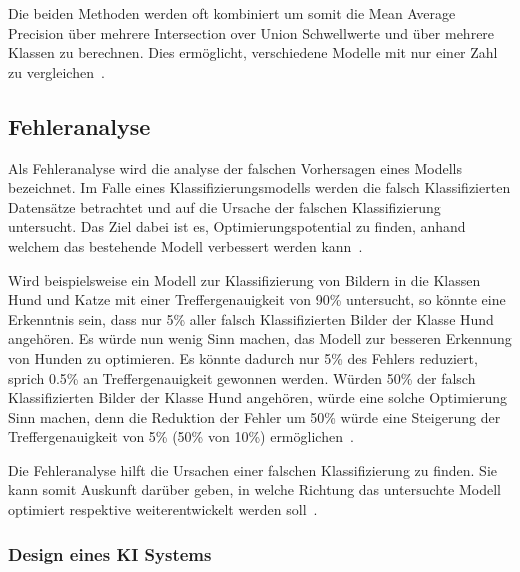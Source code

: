 Die beiden Methoden werden oft kombiniert um somit die Mean Average Precision über mehrere Intersection over Union Schwellwerte und über mehrere Klassen zu berechnen. Dies ermöglicht, verschiedene Modelle mit nur einer Zahl zu vergleichen~\autocite{AP}.

\subsection{Fehleranalyse}
\label{chap:error-analysis}

Als Fehleranalyse wird die analyse der falschen Vorhersagen eines Modells bezeichnet. Im Falle eines Klassifizierungsmodells werden die falsch Klassifizierten Datensätze betrachtet und auf die Ursache der falschen Klassifizierung untersucht. Das Ziel dabei ist es, Optimierungspotential zu finden, anhand welchem das bestehende Modell verbessert werden kann~\autocite{MLYearning}.

Wird beispielsweise ein Modell zur Klassifizierung von Bildern in die Klassen Hund und Katze mit einer Treffergenauigkeit von 90\% untersucht, so könnte eine Erkenntnis sein, dass nur 5\% aller falsch Klassifizierten Bilder der Klasse Hund angehören. Es würde nun wenig Sinn machen, das Modell zur besseren Erkennung von Hunden zu optimieren. Es könnte dadurch nur 5\% des Fehlers reduziert, sprich 0.5\% an Treffergenauigkeit gewonnen werden. Würden 50\% der falsch Klassifizierten Bilder der Klasse Hund angehören, würde eine solche Optimierung Sinn machen, denn die Reduktion der Fehler um 50\% würde eine Steigerung der Treffergenauigkeit von 5\% (50\% von 10\%) ermöglichen~\autocite{MLYearning}.

Die Fehleranalyse hilft die Ursachen einer falschen Klassifizierung zu finden. Sie kann somit Auskunft darüber geben, in welche Richtung das untersuchte Modell optimiert respektive weiterentwickelt werden soll~\autocite{MLYearning}.


\subsubsection{Design eines KI Systems}

